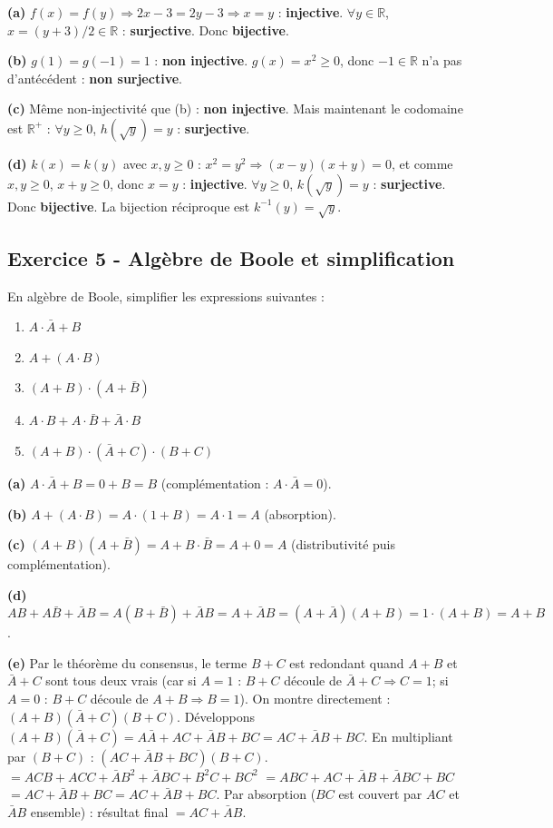 \documentclass[12pt,a4paper]{article}
\begin{document}
\begin{boitecorrige}
\textbf{(a)} $f(x)=f(y)\Rightarrow 2x-3=2y-3\Rightarrow x=y$ : \textbf{injective}. $\forall y\in\mathbb{R}$, $x=(y+3)/2\in\mathbb{R}$ : \textbf{surjective}. Donc \textbf{bijective}.

\textbf{(b)} $g(1)=g(-1)=1$ : \textbf{non injective}. $g(x)=x^2\geq0$, donc $-1\in\mathbb{R}$ n'a pas d'antécédent : \textbf{non surjective}.

\textbf{(c)} Même non-injectivité que (b) : \textbf{non injective}. Mais maintenant le codomaine est $\mathbb{R}^+$ : $\forall y\geq0$, $h(\sqrt{y})=y$ : \textbf{surjective}.

\textbf{(d)} $k(x)=k(y)$ avec $x,y\geq0$ : $x^2=y^2\Rightarrow(x-y)(x+y)=0$, et comme $x,y\geq0$, $x+y\geq0$, donc $x=y$ : \textbf{injective}. $\forall y\geq0$, $k(\sqrt{y})=y$ : \textbf{surjective}. Donc \textbf{bijective}. La bijection réciproque est $k^{-1}(y)=\sqrt{y}$.
\end{boitecorrige}

\subsection*{Exercice 5 - Algèbre de Boole et simplification \niveau{\difficile}}

\begin{boiteexercice}
En algèbre de Boole, simplifier les expressions suivantes :
\begin{enumerate}[label=(\alph*)]
  \item $A\cdot\bar{A}+B$
  \item $A+(A\cdot B)$
  \item $(A+B)\cdot(A+\bar{B})$
  \item $A\cdot B + A\cdot\bar{B} + \bar{A}\cdot B$
  \item $(A+B)\cdot(\bar{A}+C)\cdot(B+C)$
\end{enumerate}
\end{boiteexercice}

\begin{boitecorrige}
\textbf{(a)} $A\cdot\bar{A}+B = 0+B = B$ (complémentation : $A\cdot\bar{A}=0$).

\textbf{(b)} $A+(A\cdot B) = A\cdot(1+B) = A\cdot1 = A$ (absorption).

\textbf{(c)} $(A+B)(A+\bar{B}) = A+B\cdot\bar{B} = A+0 = A$ (distributivité puis complémentation).

\textbf{(d)} $AB+A\bar{B}+\bar{A}B = A(B+\bar{B})+\bar{A}B = A+\bar{A}B = (A+\bar{A})(A+B) = 1\cdot(A+B) = A+B$.

\textbf{(e)} Par le théorème du consensus, le terme $B+C$ est redondant quand $A+B$ et $\bar{A}+C$ sont tous deux vrais (car si $A=1$ : $B+C$ découle de $\bar{A}+C\Rightarrow C=1$; si $A=0$ : $B+C$ découle de $A+B\Rightarrow B=1$). On montre directement :
$(A+B)(\bar{A}+C)(B+C)$. Développons $(A+B)(\bar{A}+C) = A\bar{A}+AC+\bar{A}B+BC = AC+\bar{A}B+BC$.
En multipliant par $(B+C)$ : $(AC+\bar{A}B+BC)(B+C)$.
$= ACB+ACC+\bar{A}B^2+\bar{A}BC+B^2C+BC^2$
$= ABC+AC+\bar{A}B+\bar{A}BC+BC$
$= AC+\bar{A}B+BC = AC+\bar{A}B+BC$.
Par absorption ($BC$ est couvert par $AC$ et $\bar{A}B$ ensemble) : résultat final $= AC+\bar{A}B$.
\end{boitecorrige}
\end{document}

